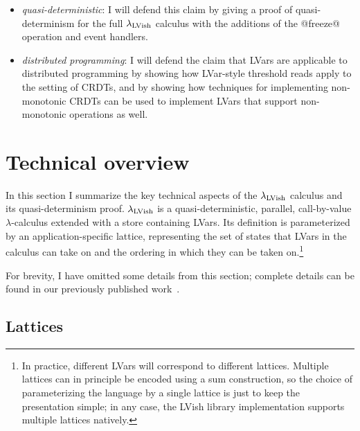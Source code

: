 \documentclass{article}
\begin{document}
\begin{itemize}
  \item \emph{quasi-deterministic}: I will defend this claim by giving
    a proof of quasi-determinism for the full $\lambda_{\textrm{LVish}}$ calculus
    with the additions of the @freeze@ operation and event handlers.

  \item \emph{distributed programming}: I will defend the claim that
    LVars are applicable to distributed programming by showing how
    LVar-style threshold reads apply to the setting of CRDTs, and by
    showing how techniques for implementing non-monotonic CRDTs can be
    used to implement LVars that support non-monotonic operations as
    well.
\end{itemize}

\section{Technical overview}\label{s:technical-overview}

In this section I summarize the key technical aspects of the
$\lambda_{\textrm{LVish}}$ calculus and its quasi-determinism proof.
$\lambda_{\textrm{LVish}}$ is a quasi-deterministic, parallel, call-by-value
$\lambda$-calculus extended with a store containing LVars.  Its
definition is parameterized by an application-specific lattice,
representing the set of states that LVars in the calculus can take on
and the ordering in which they can be taken on.\footnote{In practice,
  different LVars will correspond to different lattices.  Multiple
  lattices can in principle be encoded using a sum construction, so
  the choice of parameterizing the language by a single lattice is
  just to keep the presentation simple; in any case, the LVish library
  implementation supports multiple lattices natively.}

For brevity, I have omitted some details from this section; complete
details can be found in our previously published
work~\cite{LVars-paper, LVars-TR, Freeze-paper, Freeze-TR}.

\subsection{Lattices}
\end{document}
